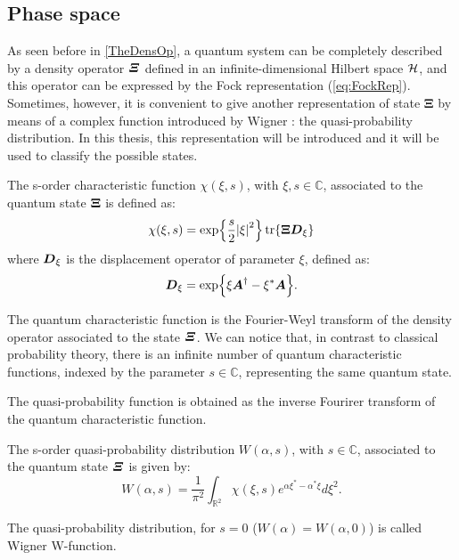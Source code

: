     \subsection{Phase space}
        As seen before in \ref{TheDensOp}, a quantum system can be completely
        described by a density operator $\bm{\relax{\varXi}}$ defined in an infinite-dimensional Hilbert space
        $\mathcal{H}$, and this operator can be expressed by the Fock representation (\ref{eq:FockRep}).
        Sometimes, however, it is convenient to give another representation of state $\pmb{\Xi}$ by
        means of a complex function introduced by Wigner \cite{Wigner}: the quasi-probability 
        distribution. In this thesis, this representation will be introduced and it will be used to
        classify the possible states.

        \begin{definition}
            The s-order characteristic function $\mathcal{\chi}(\xi,s)$, with $\xi,s\in\mathbb{C}$,
            associated to the quantum state $\bm{\relax{\Xi}}$ is defined as:
            \begin{equation}
                \mathcal{\chi}(\xi,s)=\exp{\frac{s}{2}\absolutevalue{\xi}^2}
                \tr{\Operator{\Xi}\Operator{D}_\xi}
            \end{equation}
            where $\bm{\relax{D}}_\xi$ is  the displacement operator of parameter $\xi$, defined as:
            \begin{equation}
                \bm{\relax{D}}_\xi=\exp{\xi\bm{\relax{A}}^\dagger-\xi^*\bm{\relax{A}}}.
            \end{equation}
        \end{definition}
        The quantum characteristic function is the Fourier-Weyl transform of the density operator 
        associated to the state $\bm{\relax{\varXi}}$. We can notice that, in contrast to classical 
        probability theory, there is an infinite number of quantum characteristic functions, 
        indexed by the parameter $s \in \mathbb{C}$, representing the same quantum state.

        The quasi-probability function is obtained as the inverse Fourirer transform of the 
        quantum characteristic function.
        \begin{definition}
            The s-order quasi-probability distribution $W(\alpha,s)$, with $s\in\mathbb{C}$,
            associated to the quantum state $\bm{\relax{\varXi}}$ is given by:
            \begin{equation*}
                W(\alpha,s)=\frac{1}{\pi^2}\int_{\mathbb{R}^2} 
                \mathcal{\chi}(\xi,s)e^{\alpha\xi^*-\alpha^*\xi}d\xi^2.
            \end{equation*}

        \end{definition}
        The quasi-probability distribution, for $s=0$ ($W(\alpha)=W(\alpha,0)$) is called 
        Wigner W-function.